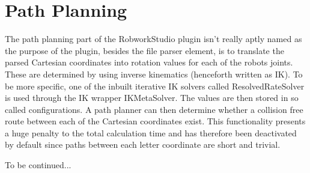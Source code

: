 \section{Path Planning}
\label{sec:pathplaning}

The path planning part of the RobworkStudio plugin isn't really aptly named as the purpose of the plugin, besides the file parser element, is to translate the parsed Cartesian coordinates into rotation values for each of the robots joints. These are determined by using inverse kinematics (henceforth written as IK). To be more specific, one of the inbuilt iterative IK solvers called ResolvedRateSolver is used through the IK wrapper IKMetaSolver. The values are then stored in so called configurations. A path planner can then determine whether a collision free route between each of the Cartesian coordinates exist. This functionality presents a huge penalty to the total calculation time and has therefore been deactivated by default since paths between each letter coordinate are short and trivial.

To be continued...